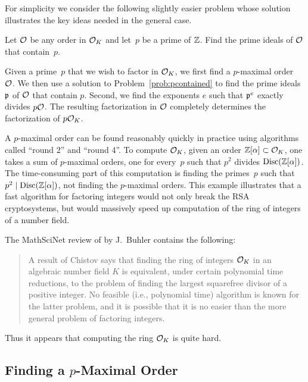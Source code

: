 For simplicity we consider the following slightly easier problem whose
solution illustrates the key ideas needed in the general case.
\begin{problem}\label{prob:pcontained}
	Let $\mathcal{O}$ be any order in $\mathcal{O}_K$ and let~$p$ be a prime of $\mathbb{Z}$.
	Find the prime ideals of $\mathcal{O}$ that contain~$p$.
\end{problem}

Given a prime~$p$
that we wish to factor in $\mathcal{O}_K$, we first find a $p$-maximal order~$\mathcal{O}$.
We then use a solution to Problem~\ref{prob:pcontained} to find
the prime ideals $\mathfrak{p}$ of $\mathcal{O}$ that contain $p$.  Second, we find
the exponents $e$ such that $\mathfrak{p}^e$ exactly divides $p\mathcal{O}$.
The resulting factorization in $\mathcal{O}$ completely determines
the factorization of $p\mathcal{O}_K$.

A $p$-maximal order can be found reasonably quickly in practice using
algorithms called ``round 2'' and ``round 4''.  To
compute $\mathcal{O}_K$, given an order $\mathbb{Z}[\alpha]\subset \mathcal{O}_K$, one takes a
sum of $p$-maximal orders, one for every~$p$ such that $p^2$ divides
$\operatorname{Disc}(\mathbb{Z}[\alpha])$.  The time-consuming part of this computation is
finding the primes~$p$ such that $p^2\mid \operatorname{Disc}(\mathbb{Z}[\alpha])$, not
finding the $p$-maximal orders.  This example illustrates that
a fast algorithm for factoring integers would not only break the RSA
cryptosystems, but would massively speed up computation of the ring of
integers of a number field.
\begin{remark}
	The MathSciNet review of \cite{buchmann_lenstra:approx} by
	J.~Buhler contains the following:
	\begin{quote}
	    A result of Chistov says that finding the ring of integers $\mathcal{O}_K$
	    in an algebraic number field $K$ is equivalent, under certain
	    polynomial time reductions, to the problem of finding the largest
	    squarefree divisor of a positive integer. No feasible (i.e.,
	    polynomial time) algorithm is known for the latter problem, and it
	    is possible that it is no easier than the more general problem of
	    factoring integers.
	\end{quote}
	Thus it appears that computing the ring $\mathcal{O}_K$ is quite hard.
\end{remark}

\subsection{Finding a $p$-Maximal Order}\label{sec:alg_pmax}

